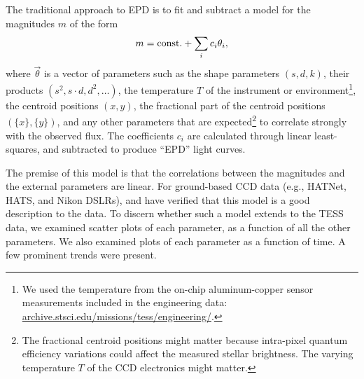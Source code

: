\documentclass[12pt,twocolumn,tighten]{aastex62}
\begin{document}
The traditional approach to EPD is to fit and
subtract a model for the magnitudes $m$ of the form
\begin{equation}
  m = {\rm const.} + \sum_i c_i \theta_i,
  \label{eq:classical_EPD}
\end{equation}
where $\vec{\theta}$ is a vector of parameters such as the shape
parameters $(s,d,k)$, their products $(s^2, s\cdot d, d^2, \ldots)$,
the temperature $T$ of the instrument or environment\footnote{ We used
the temperature from the on-chip aluminum-copper sensor measurements
included in the engineering
data: \url{archive.stsci.edu/missions/tess/engineering/}.  },
the centroid positions $(x,y)$, the fractional part of the
centroid positions $(\{x\},\{y\})$, and any other parameters that are
expected\footnote{ The fractional centroid positions might matter
because intra-pixel quantum efficiency variations could affect the
measured stellar brightness.  The varying temperature $T$ of the CCD
electronics might matter.  } to correlate strongly with the observed
flux.  The coefficients $c_i$ are calculated through linear
least-squares, and subtracted to produce ``EPD'' light curves.

The premise of this model is that the correlations between the
magnitudes and the external parameters are linear.  For ground-based
CCD data (e.g., HATNet, HATS, and Nikon DSLRs), \citet{bakos_2010} and
\citet{zhang_precision_2016} have verified that this model is a
good description to the data.
To discern whether such a model extends to the TESS data, we examined
scatter plots of each parameter, as a function of all the other
parameters.  We also examined plots of each parameter as a function of
time.  A few prominent trends were present.
\end{document}
